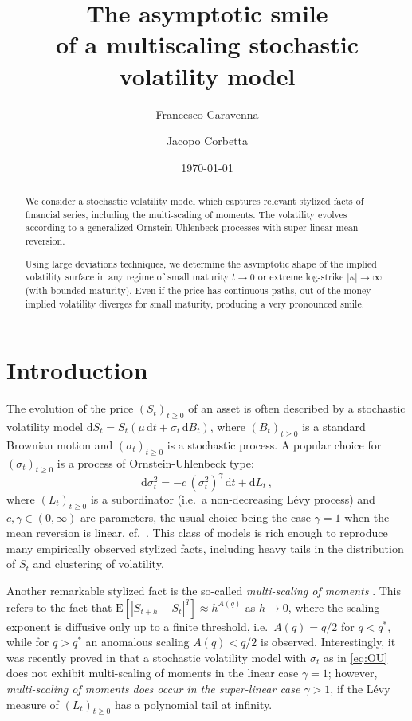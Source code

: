 \documentclass[a4paper,reqno,11pt]{amsart}
\title{}
\date{\today}
\title[Volatility smile in a multiscaling model]{The asymptotic smile\\
of a multiscaling stochastic volatility model}
\author{Francesco Caravenna}
\author{Jacopo Corbetta}
\numberwithin{equation}{section}
\newcommand{\dd}{\text{\rm d}}             %
\newcommand{\PEfont}{\mathrm}
\newcommand{\E}{\ensuremath{\PEfont E}}
\def\dd{\mathrm{d}}
\begin{document}
\MakeRobustCommand\subref


\begin{abstract}
We consider a stochastic volatility model which captures relevant stylized facts of financial series,
including the multi-scaling of moments.
The volatility evolves according to
a generalized Ornstein-Uhlenbeck processes
with super-linear mean reversion.

Using large deviations techniques, we determine the asymptotic shape of
the implied volatility surface in any regime of small maturity $t \to 0$
or extreme log-strike $|\kappa| \to \infty$ (with bounded maturity).
Even if the price has continuous paths,
out-of-the-money implied volatility diverges for small maturity,
producing a very pronounced smile.
\end{abstract}


\maketitle



\section{Introduction}

The evolution of the price $(S_t)_{t\ge 0}$ of an asset 
is often described by a stochastic
volatility model $\dd S_t = S_t (\mu \, \dd t + \sigma_t \, \dd B_t)$, where 
$(B_t)_{t\ge 0}$ is a standard Brownian motion
and $(\sigma_t)_{t\ge 0}$ is a stochastic process.
A popular choice for $(\sigma_t)_{t\ge 0}$ is a process
of Ornstein-Uhlenbeck type:
\begin{equation}\label{eq:OU}
	\dd \sigma^2_t = - c \, (\sigma^2_t)^\gamma \, \dd t + \dd L_t \,,
\end{equation}
where $(L_t)_{t\ge 0}$ is a subordinator (i.e.\ a non-decreasing L\'evy process)
and $c, \gamma \in (0,\infty)$ are parameters, the usual choice
being the case $\gamma = 1$ when the mean reversion is linear,
cf.~\cite{cf:BS}.
This class of models is rich enough to
reproduce many empirically observed stylized facts, 
including heavy tails in the distribution of $S_t$
and clustering of volatility.

Another remarkable stylized fact is the so-called \emph{multi-scaling of moments}
\cite{cf:D,cf:DAD,cf:GBPTD}. This refers to the fact that $\E[|S_{t+h}-S_t|^q] \approx h^{A(q)}$
as $h \to 0$, where the scaling exponent is diffusive
only up to a finite threshold, i.e.\ $A(q) = q/2$ for $q < q^*$, while for $q > q^*$ an anomalous
scaling $A(q) < q/2$ is observed. Interestingly, it was recently proved
in \cite{cf:DP} that a stochastic volatility model with $\sigma_t$ as in
\eqref{eq:OU} does not exhibit multi-scaling of moments 
in the linear case $\gamma=1$; however, \emph{multi-scaling of moments does occur
in the super-linear case $\gamma > 1$}, if
the L\'evy measure of $(L_t)_{t\ge 0}$
has a polynomial tail at infinity.
\end{document}
